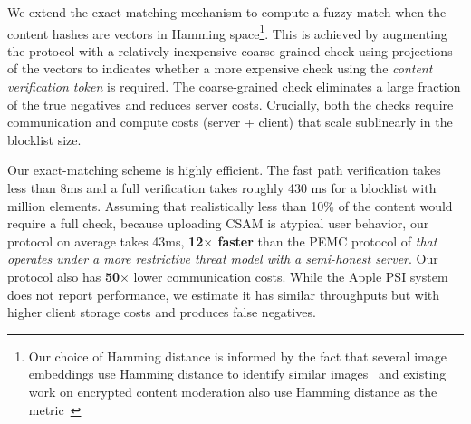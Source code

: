 %
We extend the exact-matching mechanism to compute a fuzzy
match when the content hashes are vectors 
in Hamming space\footnote{Our choice of Hamming distance is informed by the fact that several image embeddings use Hamming distance to identify similar images~\cite{singh2025perceptual,neuralHashAttack,yang2025certphash} and existing work on encrypted content moderation also use Hamming distance as the metric~\cite{kulshrestha2021identifying}}. This is achieved by augmenting the protocol with a relatively inexpensive 
coarse-grained check using projections of the vectors to indicates whether a more expensive check using the \emph{content verification token} 
is required. The coarse-grained check eliminates a large fraction of the true negatives and reduces server costs. Crucially, both the checks require communication and compute costs (server + client) that scale sublinearly in the blocklist size. 

%
Our exact-matching scheme is highly efficient. The fast path verification takes less than 8ms and a full verification 
takes roughly 430 ms for a blocklist with million elements. Assuming that realistically less than 10\% of the content would require a full check, because uploading CSAM is atypical user behavior, our protocol on average takes 43ms, \textbf{12$\times$ faster} than the PEMC protocol of \citet{kulshrestha2021identifying} \emph{that operates under a more restrictive threat model with a semi-honest server}. Our protocol also has \textbf{50$\times$} lower communication costs. 
While the Apple PSI system does not report performance, 
we estimate it has similar throughputs but with higher client storage costs and produces false negatives. 

